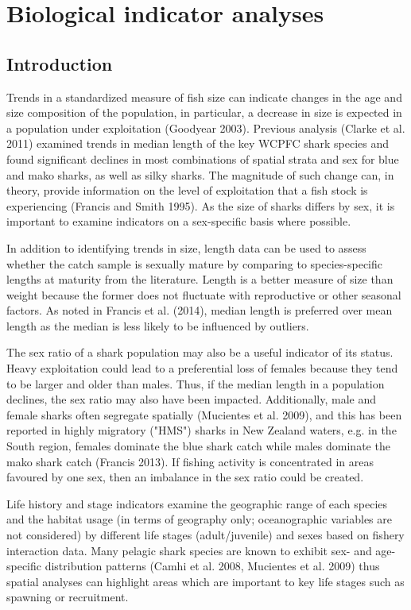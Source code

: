 \documentclass[12pt]{SCreport}
\begin{document}
\section{Biological indicator analyses}


      \subsection{Introduction}
Trends in a standardized measure of fish size can indicate changes in the age and size composition of the population, in particular, a decrease in size is expected in a population under exploitation (Goodyear 2003).  Previous analysis (Clarke et al. 2011) examined trends in median length of the key WCPFC shark species and found significant declines in most combinations of spatial strata and sex for blue and mako sharks, as well as silky sharks.  The magnitude of such change can, in theory, provide information on the level of exploitation that a fish stock is experiencing (Francis and Smith 1995). As the size of sharks differs by sex, it is important to examine indicators on a sex-specific basis where possible. 

In addition to identifying trends in size, length data can be used to assess whether the catch sample is sexually mature by comparing to species-specific lengths at maturity from the literature.  Length is a better measure of size than weight because the former does not fluctuate with reproductive or other seasonal factors. As noted in Francis et al. (2014), median length is preferred over mean length as the median is less likely to be influenced by outliers. 

The sex ratio of a shark population may also be a useful indicator of its status. Heavy exploitation could lead to a preferential loss of females because they tend to be larger and older than males. Thus, if the median length in a population declines, the sex ratio may also have been impacted. Additionally, male and female sharks often segregate spatially (Mucientes et al. 2009), and this has been reported in
highly migratory ("HMS") sharks in New Zealand waters, e.g. in the South region, females dominate the blue shark catch while males dominate the mako shark catch (Francis 2013). If fishing activity is concentrated in areas favoured by one sex, then an imbalance in the sex ratio could be created.

Life history and stage indicators examine the geographic range of each species and the habitat usage (in terms of geography only; oceanographic variables are not considered) by different life stages (adult/juvenile) and sexes based on fishery interaction data.  Many pelagic shark species are known to exhibit sex- and age- specific distribution patterns (Camhi et al. 2008, Mucientes et al. 2009) thus spatial analyses can highlight areas which are important to key life stages such as spawning or recruitment.
\end{document}
